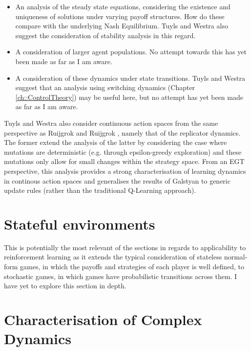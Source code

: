 \documentclass[../sample.tex]{subfiles}
\begin{document}
    \begin{itemize}
        \item  An analysis of the steady state equations, considering the existence and uniqueness
        of solutions under varying payoff structures. How do these compare with the underlying Nash
        Equilibrium. Tuyls and Westra also suggest the consideration of stability analysis in this regard.
        \item A consideration of larger agent populations. No attempt towards this has yet been made
        as far as I am aware.
        \item A consideration of these dynamics under state transitions. Tuyls and Westra suggest
        that an analysis using switching dynamics (Chapter \ref{ch::ControlTheory}) may be useful
        here, but no attempt has yet been made as far as I am aware.
    \end{itemize}

    Tuyls and Westra \cite{TuylesWestra} also consider continuous action spaces from the same
    perspective as Ruijgrok and Ruijgrok \cite{Ruijgrok}, namely that of the replicator dynamics.
    The former extend the analysis of the latter by considering the case where mutations are
    deterministic (e.g. through epsilon-greedy exploration) and these mutations only allow for small
    changes within the strategy space. From an EGT perspective, this analysis provides a strong
    characterisation of learning dynamics in continous action spaces and generalises the results of
    Galstyan to generic update rules (rather than the traditional Q-Learning approach). 

    \section{Stateful environments} \label{sec::Stateful}

    This is potentially the most relevant of the sections in regards to applicability to
    reinforcement learning as it extends the typical consideration of stateless normal-form games,
    in which the payoffs and strategies of each player is well defined, to stochastic games, in
    which games have probabilistic transitions across them. I have yet to explore this section in
    depth.

    \section{Characterisation of Complex Dynamics}
\end{document}
